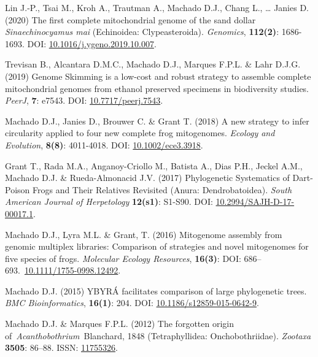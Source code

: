 {\begin{hangparas}{.25in}{1}
	    Lin J.-P., Tsai M., Kroh A., Trautman A., Machado D.J., Chang L., … Janies D. (2020) The first complete mitochondrial genome of the sand dollar \emph{Sinaechinocyamus mai} (Echinoidea: Clypeasteroida). \emph{Genomics}, \textbf{112(2)}: 1686-1693. DOI: \href{https://doi.org/10.1016/j.ygeno.2019.10.007}{10.1016/j.ygeno.2019.10.007}.


		Trevisan B., Alcantara D.M.C., Machado D.J., Marques F.P.L. \& Lahr D.J.G. (2019) Genome Skimming is a low-cost and robust strategy to assemble complete mitochondrial genomes from ethanol preserved specimens in biodiversity studies. \emph{PeerJ}, \textbf{7}: e7543. DOI: \href{https://doi.org/10.7717/peerj.7543}{10.7717/peerj.7543}.


		Machado D.J., Janies D., Brouwer C. \& Grant T. (2018) A new strategy to infer circularity applied to four new complete frog mitogenomes. \emph{Ecology and Evolution}, \textbf{8(8)}: 4011-4018. DOI: \href{http://doi.wiley.com/10.1002/ece3.3918}{10.1002/ece3.3918}.


		Grant T., Rada M.A., Anganoy-Criollo M., Batista A., Dias P.H., Jeckel A.M., Machado D.J. \& Rueda-Almonacid J.V. (2017) Phylogenetic Systematics of Dart-Poison Frogs and Their Relatives Revisited (Anura: Dendrobatoidea). \emph{South American Journal of Herpetology} \textbf{12(s1)}: S1-S90. DOI: \href{http://www.bioone.org/doi/10.2994/SAJH-D-17-00017.1}{10.2994/SAJH-D-17-00017.1}.


		Machado D.J., Lyra M.L. \& Grant, T. (2016) Mitogenome assembly from genomic multiplex libraries: Comparison of strategies and novel mitogenomes for five species of frogs. \emph{Molecular Ecology Resources}, \textbf{16(3)}: DOI: 686--693.~\href{https://doi.org/10.1111/1755-0998.12492}{10.1111/1755-0998.12492}.


		Machado D.J. (2015) YBYRÁ facilitates comparison of large phylogenetic trees. \emph{BMC Bioinformatics}, \textbf{16(1)}: 204. DOI: \href{https://doi.org/10.1186/s12859-015-0642-9}{10.1186/s12859-015-0642-9}.


		Machado D.J. \& Marques F.P.L. (2012) The forgotten origin of~\emph{Acanthobothrium}~Blanchard, 1848 (Tetraphyllidea: Onchobothriidae). \emph{Zootaxa} \textbf{3505}: 86--88. ISSN: \href{http://www.mapress.com/zootaxa/2012/f/z03505p088f.pdf}{11755326}.

		\end{hangparas}
	}
        
